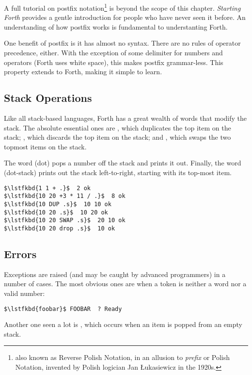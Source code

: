 A full tutorial on postfix notation\footnote{also known as Reverse Polish
  Notation, in an allusion to {\em prefix\/} or Polish Notation, invented by
  Polish logician Jan Łukasiewicz in the 1920s.} is beyond the scope of this
chapter. {\em Starting Forth\/} provides a gentle introduction for people who
have never seen it before. An understanding of how postfix works is fundamental
to understanting Forth.

One benefit of postfix is it has almost no syntax. There are no rules of
operator precedence, either. With the exception of some delimiter for numbers
and operators (Forth uses white space), this makes postfix grammar-less. This
property extends to Forth, making it simple to learn.

\subsection{Stack Operations}

Like all stack-based languages, Forth has a great wealth of words that modify
the stack. The absolute essential ones are , which duplicates the top
item on the stack; , which discards the top item on the stack; and
, which swaps the two topmost items on the stack.

The word  (dot) pops a number off the stack and prints it out. Finally,
the word  (dot-stack) prints out the stack left-to-right, starting with
its top-most item.

\begin{lstlisting}[mathescape=true,numbers=none]
$\lstfkbd{1 1 + .}$  2 ok
$\lstfkbd{10 20 +3 * 11 / .}$  8 ok
$\lstfkbd{10 DUP .s}$  10 10 ok
$\lstfkbd{10 20 .s}$  10 20 ok
$\lstfkbd{10 20 SWAP .s}$  20 10 ok
$\lstfkbd{10 20 drop .s}$  10 ok
\end{lstlisting}


\subsection{Errors}

Exceptions are raised (and may be caught by advanced programmers) in a number
of cases. The most obvious ones are when a token is neither a word nor a valid
number:

\begin{lstlisting}[mathescape=true,numbers=none]
$\lstfkbd{foobar}$ FOOBAR  ? Ready
\end{lstlisting}

\noindent Another one seen a lot is , which occurs when an item
is popped from an empty stack.


